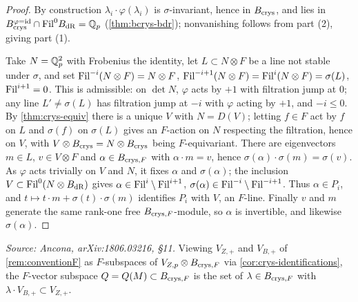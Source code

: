 \begin{proof}
  By construction \(\lambda_i \cdot \varphi(\lambda_i)\) is \(\sigma\)-invariant,
  hence in \(B_{\mathrm{crys}}\), and lies in \(B_{\mathrm{crys}}^{\varphi=\mathrm{id}} \cap \mathrm{Fil}^0 B_{\mathrm{dR}} =
  \mathbb{Q}_p\) (\cref{thm:bcrys-bdr}); nonvanishing follows from part (2), giving part
  (1).

  Take \(N = \mathbb{Q}_p^2\) with Frobenius the identity, let \(L \subset N \otimes F\)
  be a line not stable under \(\sigma\), and set \(\mathrm{Fil}^{-i}(N \otimes F) =
  N \otimes F\), \(\mathrm{Fil}^{-i+1}(N \otimes F) = \mathrm{Fil}^i(N \otimes F) = \sigma(L)\),
  \(\mathrm{Fil}^{i+1} = 0\). This is admissible: on \(\det N\), \(\varphi\) acts by
  \(+1\) with filtration jump at \(0\); any line \(L' \neq \sigma(L)\) has
  filtration jump at \(-i\) with \(\varphi\) acting by \(+1\), and \(-i \leq 0\).
  By \cref{thm:crys-equiv} there is a unique \(V\) with \(N = D(V)\); letting
  \(f \in F\) act by \(f\) on \(L\) and \(\sigma(f)\) on \(\sigma(L)\) gives an
  \(F\)-action on \(N\) respecting the filtration, hence on \(V\), with
  \(V \otimes B_{\mathrm{crys}} = N \otimes B_{\mathrm{crys}}\) being \(F\)-equivariant. There are
  eigenvectors \(m \in L\), \(v \in V \otimes F\) and \(\alpha \in B_{\mathrm{crys},F}\)
  with \(\alpha \cdot m = v\), hence \(\sigma(\alpha) \cdot \sigma(m) =
  \sigma(v)\). As \(\varphi\) acts trivially on \(V\) and \(N\), it fixes
  \(\alpha\) and \(\sigma(\alpha)\); the inclusion \(V \subset \mathrm{Fil}^0(N \otimes
  B_{\mathrm{dR}})\) gives \(\alpha \in \mathrm{Fil}^i \setminus \mathrm{Fil}^{i+1}\),
  \(\sigma(\alpha) \in \mathrm{Fil}^{-i} \setminus \mathrm{Fil}^{-i+1}\). Thus \(\alpha \in P_i\),
  and \(t \mapsto t \cdot m + \sigma(t) \cdot \sigma(m)\) identifies \(P_i\) with
  \(V\), an \(F\)-line. Finally \(v\) and \(m\) generate the same rank-one free
  \(B_{\mathrm{crys},F}\)-module, so \(\alpha\) is invertible, and likewise
  \(\sigma(\alpha)\).
\end{proof}

\begin{definition}
  \label{def:Q-ram}
  \textit{Source: Ancona, arXiv:1806.03216, \S11.}
  Viewing \(V_{Z,+}\) and \(V_{B,+}\) of \cref{rem:conventionF} as \(F\)-subspaces
  of \(V_{Z,p} \otimes B_{\mathrm{crys},F}\) via \cref{cor:crys-identifications}, the
  \(F\)-vector subspace \(Q = Q(M) \subset B_{\mathrm{crys},F}\) is the set of
  \(\lambda \in B_{\mathrm{crys},F}\) with \(\lambda \cdot V_{B,+} \subset V_{Z,+}\).
\end{definition}

